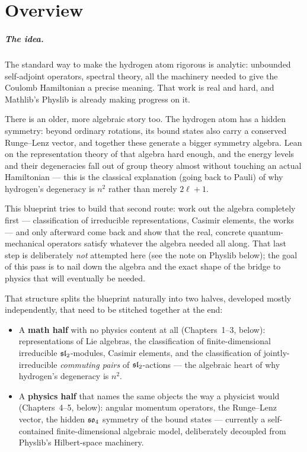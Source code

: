 \chapter*{Overview}

\paragraph{The idea.} The standard way to make the hydrogen atom rigorous is
analytic: unbounded self-adjoint operators, spectral theory, all the
machinery needed to give the Coulomb Hamiltonian a precise meaning. That work
is real and hard, and Mathlib's Physlib is already making progress on it.

There is an older, more algebraic story too. The hydrogen atom has a hidden
symmetry: beyond ordinary rotations, its bound states also carry a conserved
Runge--Lenz vector, and together these generate a bigger symmetry algebra.
Lean on the representation theory of that algebra hard enough, and the
energy levels and their degeneracies fall out of group theory almost without
touching an actual Hamiltonian --- this is the classical explanation (going
back to Pauli) of why hydrogen's degeneracy is $n^2$ rather than merely
$2\ell+1$.

This blueprint tries to build that second route: work out the algebra
completely first --- classification of irreducible representations, Casimir
elements, the works --- and only afterward come back and show that the real,
concrete quantum-mechanical operators satisfy whatever the algebra needed
all along. That last step is deliberately \emph{not} attempted here (see the
note on Physlib below); the goal of this pass is to nail down the algebra and
the exact shape of the bridge to physics that will eventually be needed.

That structure splits the blueprint naturally into two halves, developed
mostly independently, that need to be stitched together at the end:
\begin{itemize}
  \item A \textbf{math half} with no physics content at all (Chapters~1--3,
    below): representations of Lie algebras, the classification of
    finite-dimensional irreducible $\mathfrak{sl}_2$-modules, Casimir elements, and
    the classification of jointly-irreducible \emph{commuting pairs} of
    $\mathfrak{sl}_2$-actions --- the algebraic heart of why hydrogen's degeneracy is
    $n^2$.
  \item A \textbf{physics half} that names the same objects the way a
    physicist would (Chapters~4--5, below): angular momentum operators, the
    Runge--Lenz vector, the hidden $\mathfrak{so}_4$ symmetry of the bound states ---
    currently a self-contained finite-dimensional algebraic model,
    deliberately decoupled from Physlib's Hilbert-space machinery.
\end{itemize}

